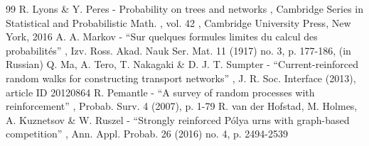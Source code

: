 \documentclass[11pt]{article}
\numberwithin{equation}{section}
\theoremstyle{definition}
\begin{document}
\begin{thebibliography}{99}
 R. Lyons \& Y. Peres - Probability on trees and networks , Cambridge Series in Statistical and Probabilistic Math. , vol. 42 , Cambridge University Press, New York, 2016
 A. A. Markov - “Sur quelques formules limites du calcul des probabilités” , Izv. Ross. Akad. Nauk Ser. Mat. 11 (1917) no. 3, p. 177-186, (in Russian)
 Q. Ma, A. Tero, T. Nakagaki \& D. J. T. Sumpter - “Current-reinforced random walks for constructing transport networks” , J. R. Soc. Interface (2013), article ID 20120864
 R. Pemantle - “A survey of random processes with reinforcement” , Probab. Surv. 4 (2007), p. 1-79
 R. van der Hofstad, M. Holmes, A. Kuznetsov \& W. Ruszel - “Strongly reinforced Pólya urns with graph-based competition” , Ann. Appl. Probab. 26 (2016) no. 4, p. 2494-2539
\end{thebibliography}
\end{document}
